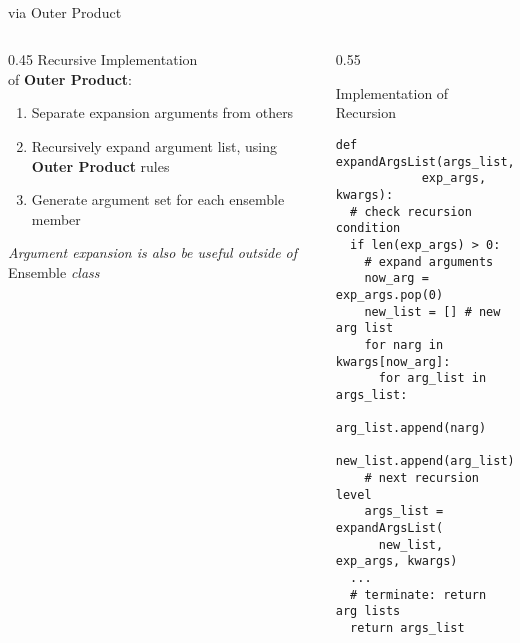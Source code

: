 \documentclass[hyperref={pdfpagelabels=false},compress,final]{beamer}
\newenvironment{myCode}[3][shadow=true]%
{\begin{center} \begin{minipage}{#2} \begin{beamerboxesrounded}[#1]{#3}}%
      {\end{beamerboxesrounded} \end{minipage} \end{center}}
\begin{document}
\begin{frame}[fragile=singleslide]{\\ \hspace*{0.03\textwidth} via Outer Product}
  \begin{columns}
    \begin{column}{0.45\textwidth}
      { \large Recursive Implementation \\ \smallskip of { \textbf{Outer Product}}:} \\
      \small
      \begin{enumerate}
        \item Separate expansion arguments from others
        \item<2-> Recursively expand argument list, using \textbf{Outer Product} rules
        \item<2-> Generate argument set for each ensemble member
      \end{enumerate}
      \medskip
      \textit{Argument expansion is also be useful outside of} Ensemble \textit{class}
    \end{column}
    \begin{column}{0.55\textwidth}
      \vspace*{-1.5cm}
      \begin{myCode}{1.\textwidth}{Implementation of Recursion}
        \small
        \begin{verbatim}
def expandArgsList(args_list,
            exp_args, kwargs):
  # check recursion condition
  if len(exp_args) > 0:
    # expand arguments
    now_arg = exp_args.pop(0)
    new_list = [] # new arg list
    for narg in kwargs[now_arg]:
      for arg_list in args_list:
        arg_list.append(narg)
        new_list.append(arg_list)
    # next recursion level
    args_list = expandArgsList(
      new_list, exp_args, kwargs)
  ...
  # terminate: return arg lists
  return args_list
        \end{verbatim}
      \end{myCode}
    \end{column}
  \end{columns}
\end{frame}
\end{document}
